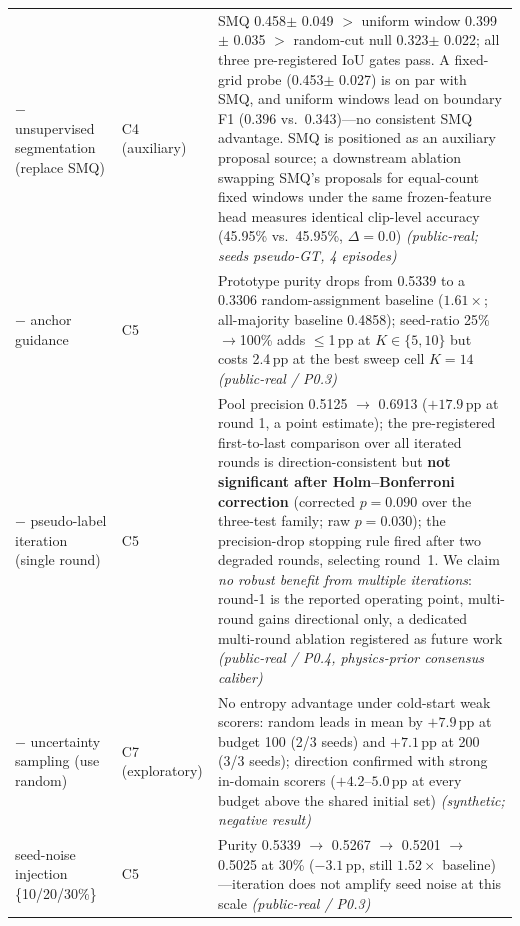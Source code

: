 \begin{table}[pos=htbp]
\begin{tabularx}{\linewidth}{>{\raggedright\arraybackslash}p{2.6cm}>{\raggedright\arraybackslash}p{1.8cm}>{\raggedright\arraybackslash}X}
$-$ unsupervised segmentation (replace SMQ) & C4 (auxiliary) & SMQ 0.458$\pm$ 0.049 $>$ uniform window 0.399$\pm$ 0.035 $>$ random-cut null 0.323$\pm$ 0.022; all three pre-registered IoU gates pass. A fixed-grid probe (0.453$\pm$ 0.027) is on par with SMQ, and uniform windows lead on boundary F1 (0.396 vs.\ 0.343)---no consistent SMQ advantage. SMQ is positioned as an auxiliary proposal source; a downstream ablation swapping SMQ's proposals for equal-count fixed windows under the same frozen-feature head measures identical clip-level accuracy (45.95\% vs.\ 45.95\%, $\Delta = 0.0$) \emph{(public-real; seeds pseudo-GT, 4 episodes)} \\
$-$ anchor guidance & C5 & Prototype purity drops from 0.5339 to a 0.3306 random-assignment baseline ($1.61\times$; all-majority baseline 0.4858); seed-ratio 25\%$\to$100\% adds $\leq$1\,pp at $K\in\{5,10\}$ but costs 2.4\,pp at the best sweep cell $K{=}14$ \emph{(public-real / P0.3)} \\
$-$ pseudo-label iteration (single round) & C5 & Pool precision 0.5125 $\to$ 0.6913 ($+17.9$\,pp at round 1, a point estimate); the pre-registered first-to-last comparison over all iterated rounds is direction-consistent but \textbf{not significant after Holm--Bonferroni correction} (corrected $p=0.090$ over the three-test family; raw $p=0.030$); the precision-drop stopping rule fired after two degraded rounds, selecting round~1. We claim \emph{no robust benefit from multiple iterations}: round-1 is the reported operating point, multi-round gains directional only, a dedicated multi-round ablation registered as future work \emph{(public-real / P0.4, physics-prior consensus caliber)} \\
$-$ uncertainty sampling (use random) & C7 (exploratory) & No entropy advantage under cold-start weak scorers: random leads in mean by $+7.9$\,pp at budget 100 (2/3 seeds) and $+7.1$\,pp at 200 (3/3 seeds); direction confirmed with strong in-domain scorers ($+4.2$--$5.0$\,pp at every budget above the shared initial set) \emph{(synthetic; negative result)} \\
seed-noise injection \{10/20/30\%\} & C5 & Purity 0.5339 $\to$ 0.5267 $\to$ 0.5201 $\to$ 0.5025 at 30\% ($-3.1$\,pp, still $1.52\times$ baseline)---iteration does not amplify seed noise at this scale \emph{(public-real / P0.3)} \\
\hline
\end{tabularx}
\end{table}

